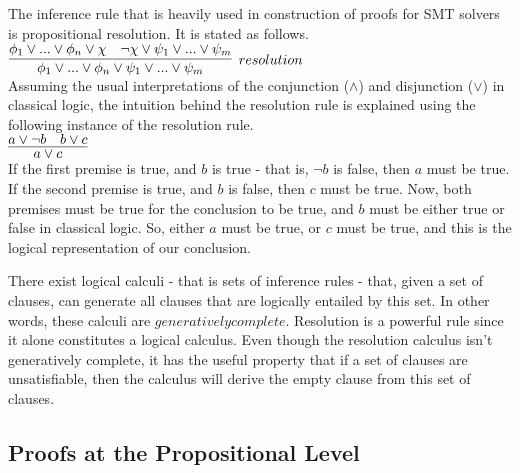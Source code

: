 \documentclass{article}
\begin{document}
The inference rule that is heavily used in construction of 
proofs for SMT solvers is propositional resolution. It is
stated as follows. \\
$\infer[resolution]{\phi_1 \lor ... \lor \phi_n \lor \psi_1 \lor ... \lor \psi_m}
{\phi_1 \lor ... \lor \phi_n \lor \chi & \neg \chi \lor \psi_1 \lor ... \lor \psi_m}$ \\

Assuming the usual interpretations of the conjunction
($\land$) and disjunction ($\lor$) in classical logic, the 
intuition behind the resolution rule is explained using the 
following instance of the resolution rule. \\
$\infer{a \lor c}{a \lor \neg b & b \lor c}$ \\
If the first premise is true, and $b$ is true - that is, 
$\neg b$ is false, then $a$ must be true. If the second 
premise is true, and $b$ is false, then $c$ must be true.
Now, both premises must be true for the conclusion to be true, 
and $b$ must be either true or false in classical logic. 
So, either $a$ must be true, or $c$ must be true, and this 
is the logical representation of our conclusion.

There exist logical calculi - that is sets of inference 
rules - that, given a set of clauses, can generate all 
clauses that are logically entailed by this set. In other 
words, these calculi are $generatively complete$. Resolution 
is a powerful rule since it alone constitutes a logical 
calculus. Even though the resolution calculus 
isn't generatively complete, it has the useful property that 
if a set of clauses are unsatisfiable, then the calculus will 
derive the empty clause from this set of clauses. 


\subsection{Proofs at the Propositional Level}
\label{sec:propproofs}
\end{document}

